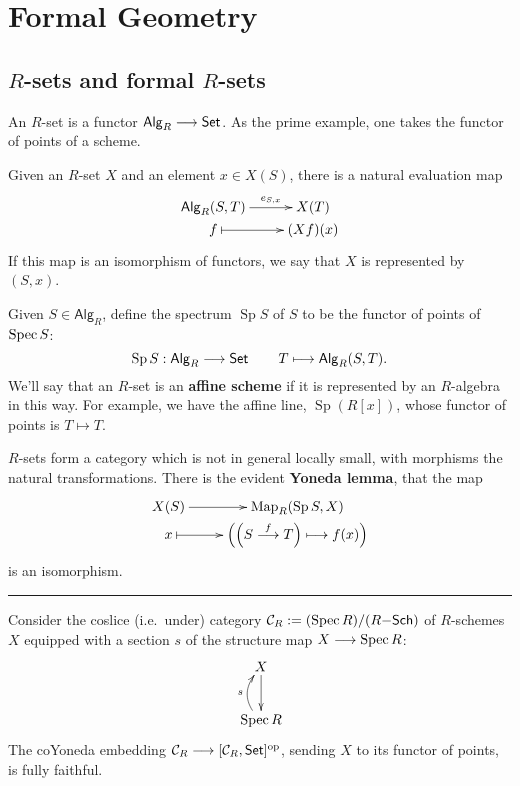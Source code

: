 \documentclass[11pt]{article}
\newcommand{\RAlg}{\mathsf{Alg}_R}
\DeclareMathOperator{\SPec}{Sp}
\begin{document}
\section{Formal Geometry}
\subsection{$R$-sets and formal $R$-sets}
\begin{itemise}
\setlength{\parindent}{.25in}
\item An $R$-set is a functor $\RAlg\to\Set$. As the prime example, one takes the functor of points of a scheme.
\item Given an $R$-set $X$ and an element $x\in X(S)$, there is a natural evaluation map
\[\xymatrix@R=0mm{
\ar[r]^-{e_{S,x}}%
\RAlg(S,T)&%
X(T)\\%
f%
\ar@{|->}[r]&
(Xf)(x)%
}\]
If this map is an isomorphism of functors, we say that $X$ is represented by $(S,x)$.
\item Given $S\in\RAlg$, define the spectrum $\SPec S$ of $S$ to be the functor of points of $\operatorname{Spec} S$:
\[\SPec S:\RAlg\to\Set\qquad T\mapsto \RAlg(S,T).\]
We'll say that an $R$-set is an \textbf{affine scheme} if it is represented by an $R$-algebra in this way. For example, we have the affine line, $\SPec(R[x])$, whose functor of points is $T\mapsto T$.
\item $R$-sets form a category which is not in general locally small, with morphisms the natural transformations. There is the evident \textbf{Yoneda lemma}, that the map
\[\xymatrix@R=0mm{
\ar[r]^-{}%
X(S)&%
\Map_R(\SPec S,X)\\%
x%
\ar@{|->}[r]&
\left(\left(S\overset{f}{\to}T\right)\mapsto f(x)\right)%
}\]
is an isomorphism.
\hrule
\begin{shaded}
\item Consider the coslice (i.e.\ under) category $\mathcal{C}_R:=(\operatorname{Spec} R)/(R\mathsf{-Sch})$ of $R$-schemes $X$ equipped with a section $s$ of the structure map $X\longrightarrow\operatorname{Spec} R$:
\[\xymatrix{
X
\ar[d]
\\%
\Spec R
\ar@/^1em/[u]^-{s}
}\]
The coYoneda embedding $\mathcal{C}_R\longrightarrow[\mathcal{C}_R,\operatorname{{\mathsf{Set}}}]^{\textup{op}}$, sending $X$ to its functor of points, is fully faithful.


\end{shaded}
\end{itemise}
\end{document}
